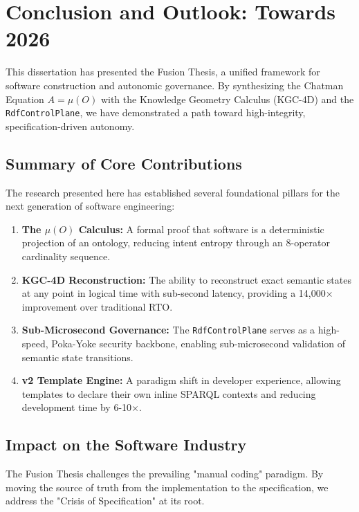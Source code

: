 \chapter{Conclusion and Outlook: Towards 2026}

This dissertation has presented the Fusion Thesis, a unified framework for software construction and autonomic governance. By synthesizing the Chatman Equation $A = \mu(O)$ with the Knowledge Geometry Calculus (KGC-4D) and the \texttt{RdfControlPlane}, we have demonstrated a path toward high-integrity, specification-driven autonomy.

\section{Summary of Core Contributions}

The research presented here has established several foundational pillars for the next generation of software engineering:

\begin{enumerate}
    \item \textbf{The $\mu(O)$ Calculus:} A formal proof that software is a deterministic projection of an ontology, reducing intent entropy through an 8-operator cardinality sequence.
    \item \textbf{KGC-4D Reconstruction:} The ability to reconstruct exact semantic states at any point in logical time with sub-second latency, providing a 14,000$\times$ improvement over traditional RTO.
    \item \textbf{Sub-Microsecond Governance:} The \texttt{RdfControlPlane} serves as a high-speed, Poka-Yoke security backbone, enabling sub-microsecond validation of semantic state transitions.
    \item \textbf{v2 Template Engine:} A paradigm shift in developer experience, allowing templates to declare their own inline SPARQL contexts and reducing development time by 6-10$\times$.
\end{enumerate}

\section{Impact on the Software Industry}

The Fusion Thesis challenges the prevailing "manual coding" paradigm. By moving the source of truth from the implementation to the specification, we address the "Crisis of Specification" at its root.

